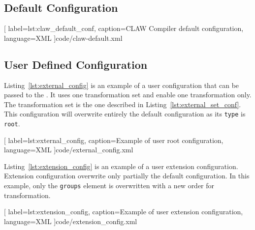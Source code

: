 \subsection{Default Configuration}

  [
    label=lst:claw_default_conf,
    caption=CLAW Compiler default configuration,
    language=XML
  ]{code/claw-default.xml}

\subsection{User Defined Configuration}
Listing~\ref{lst:external_config} is an example of a user configuration that
can be passed to the \clawfcomp. It uses one transformation set and enable
one transformation only. The transformation set is the one described in
Listing~\ref{lst:external_set_conf}. This configuration will overwrite
entirely the default configuration as its \lstinline!type! is \lstinline!root!.


  [
    label=lst:external_config,
    caption=Example of user root configuration,
    language=XML
  ]{code/external_config.xml}

Listing~\ref{lst:extension_config} is an example of a user extension
configuration. Extension configuration overwrite only partially the default
configuration. In this example, only the \lstinline!groups! element is
overwritten with a new order for transformation.


  [
    label=lst:extension_config,
    caption=Example of user extension configuration,
    language=XML
  ]{code/extension_config.xml}
